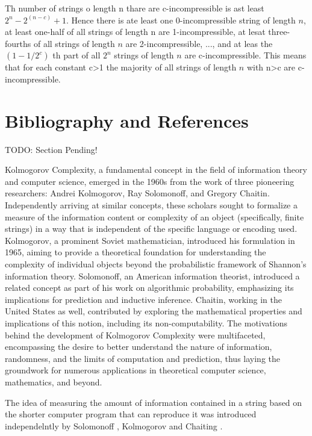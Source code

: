 Th number of strings o length n thare are c-incompressible is ast least $2^n - 2^(n-c) + 1$. Hence there is ate least one 0-incompressible string of length $n$, at least one-half of all strings of length n are 1-incompressible, at lesat three-fourths of all strings of length $n$ are 2-incompressible, ..., and at leas the $(1-1/2^c)$ th part of all $2^n$ strings of length $n$ are c-incompressible. This means that for each constant c>1 the majority of all strings of length $n$ with n>c are c-incompressible.


%
%

\section*{Bibliography and References}

{\color{red} TODO: Section Pending!}

{\color{red} Kolmogorov Complexity, a fundamental concept in the field of information theory and computer science, emerged in the 1960s from the work of three pioneering researchers: Andrei Kolmogorov, Ray Solomonoff, and Gregory Chaitin. Independently arriving at similar concepts, these scholars sought to formalize a measure of the information content or complexity of an object (specifically, finite strings) in a way that is independent of the specific language or encoding used. Kolmogorov, a prominent Soviet mathematician, introduced his formulation in 1965, aiming to provide a theoretical foundation for understanding the complexity of individual objects beyond the probabilistic framework of Shannon's information theory. Solomonoff, an American information theorist, introduced a related concept as part of his work on algorithmic probability, emphasizing its implications for prediction and inductive inference. Chaitin, working in the United States as well, contributed by exploring the mathematical properties and implications of this notion, including its non-computability. The motivations behind the development of Kolmogorov Complexity were multifaceted, encompassing the desire to better understand the nature of information, randomness, and the limits of computation and prediction, thus laying the groundwork for numerous applications in theoretical computer science, mathematics, and beyond. }


The idea of measuring the amount of information contained in a string based on the shorter computer program that can reproduce it was introduced independelntly by Solomonoff \cite{solomonoff1964formal}, Kolmogorov \cite{kolmogorov1965three} and Chaiting \cite{chaitin1969simplicity}.

